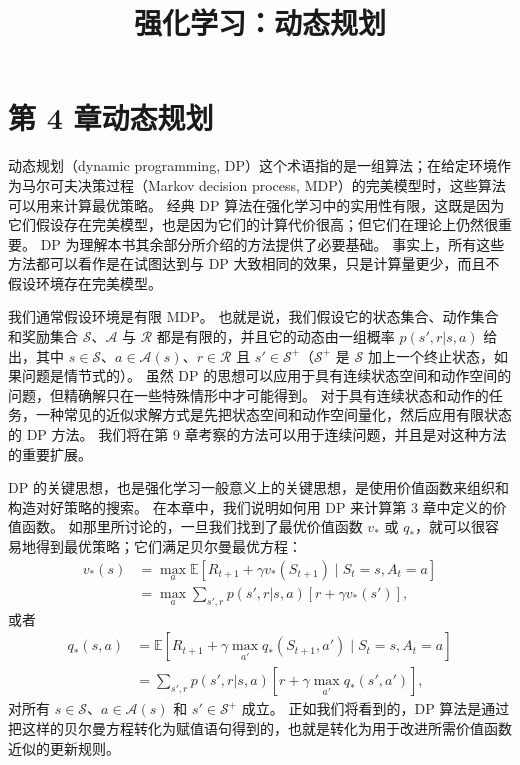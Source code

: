 \documentclass[UTF8,12pt,a4paper,fontset=fandol]{ctexart}
\title{强化学习：动态规划}
\author{}
\date{}
\begin{document}
\maketitle

\section*{第 4 章\quad 动态规划}

动态规划（dynamic programming, DP）这个术语指的是一组算法；在给定环境作为马尔可夫决策过程（Markov decision process, MDP）的完美模型时，这些算法可以用来计算最优策略。
经典 DP 算法在强化学习中的实用性有限，这既是因为它们假设存在完美模型，也是因为它们的计算代价很高；但它们在理论上仍然很重要。
DP 为理解本书其余部分所介绍的方法提供了必要基础。
事实上，所有这些方法都可以看作是在试图达到与 DP 大致相同的效果，只是计算量更少，而且不假设环境存在完美模型。

我们通常假设环境是有限 MDP。
也就是说，我们假设它的状态集合、动作集合和奖励集合 $\mathcal{S}$、$\mathcal{A}$ 与 $\mathcal{R}$ 都是有限的，并且它的动态由一组概率 $p(s',r|s,a)$ 给出，其中 $s\in\mathcal{S}$、$a\in\mathcal{A}(s)$、$r\in\mathcal{R}$ 且 $s'\in\mathcal{S}^+$（$\mathcal{S}^+$ 是 $\mathcal{S}$ 加上一个终止状态，如果问题是情节式的）。
虽然 DP 的思想可以应用于具有连续状态空间和动作空间的问题，但精确解只在一些特殊情形中才可能得到。
对于具有连续状态和动作的任务，一种常见的近似求解方式是先把状态空间和动作空间量化，然后应用有限状态的 DP 方法。
我们将在第 9 章考察的方法可以用于连续问题，并且是对这种方法的重要扩展。

DP 的关键思想，也是强化学习一般意义上的关键思想，是使用价值函数来组织和构造对好策略的搜索。
在本章中，我们说明如何用 DP 来计算第 3 章中定义的价值函数。
如那里所讨论的，一旦我们找到了最优价值函数 $v_*$ 或 $q_*$，就可以很容易地得到最优策略；它们满足贝尔曼最优方程：
\begin{equation}
\begin{aligned}
v_*(s)
&= \max_a \mathbb{E}\!\left[R_{t+1}+\gamma v_*(S_{t+1}) \mid S_t=s,A_t=a\right] \\
&= \max_a \sum_{s',r} p(s',r|s,a)\left[r+\gamma v_*(s')\right],
\end{aligned}
\tag{4.1}
\end{equation}
或者
\begin{equation}
\begin{aligned}
q_*(s,a)
&= \mathbb{E}\!\left[R_{t+1}+\gamma\max_{a'}q_*(S_{t+1},a') \mid S_t=s,A_t=a\right] \\
&= \sum_{s',r} p(s',r|s,a)\left[r+\gamma\max_{a'}q_*(s',a')\right],
\end{aligned}
\tag{4.2}
\end{equation}
对所有 $s\in\mathcal{S}$、$a\in\mathcal{A}(s)$ 和 $s'\in\mathcal{S}^+$ 成立。
正如我们将看到的，DP 算法是通过把这样的贝尔曼方程转化为赋值语句得到的，也就是转化为用于改进所需价值函数近似的更新规则。
\end{document}
